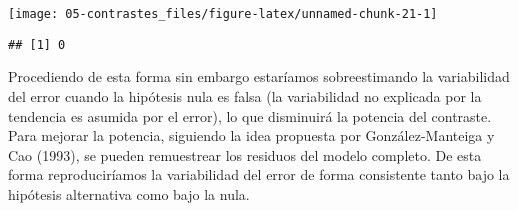 \documentclass[
]{book}
\newenvironment{Shaded}{\begin{snugshade}}{\end{snugshade}}
\newcommand{\AttributeTok}[1]{\textcolor[rgb]{0.77,0.63,0.00}{#1}}
\newcommand{\CommentTok}[1]{\textcolor[rgb]{0.56,0.35,0.01}{\textit{#1}}}
\newcommand{\ConstantTok}[1]{\textcolor[rgb]{0.00,0.00,0.00}{#1}}
\newcommand{\DecValTok}[1]{\textcolor[rgb]{0.00,0.00,0.81}{#1}}
\newcommand{\FunctionTok}[1]{\textcolor[rgb]{0.00,0.00,0.00}{#1}}
\newcommand{\NormalTok}[1]{#1}
\newcommand{\OtherTok}[1]{\textcolor[rgb]{0.56,0.35,0.01}{#1}}
\newcommand{\SpecialCharTok}[1]{\textcolor[rgb]{0.00,0.00,0.00}{#1}}
\newcommand{\StringTok}[1]{\textcolor[rgb]{0.31,0.60,0.02}{#1}}
\theoremstyle{break}
\theoremstyle{definition}
\theoremstyle{definition}
\theoremstyle{definition}
\theoremstyle{definition}
\theoremstyle{remark}
\begin{document}
\begin{Shaded}
\end{Shaded}

\begin{center}\texttt{[image: 05-contrastes\_files/figure-latex/unnamed-chunk-21-1]} \end{center}

\begin{Shaded}
\end{Shaded}

\begin{verbatim}
## [1] 0
\end{verbatim}

Procediendo de esta forma sin embargo estaríamos sobreestimando la variabilidad
del error cuando la hipótesis nula es falsa (la variabilidad no explicada por la
tendencia es asumida por el error), lo que disminuirá la potencia del contraste.
Para mejorar la potencia, siguiendo la idea propuesta por González-Manteiga
y Cao (1993), se pueden remuestrear los residuos del modelo completo.
De esta forma reproduciríamos la variabilidad del error de forma consistente
tanto bajo la hipótesis alternativa como bajo la nula.
\end{document}
